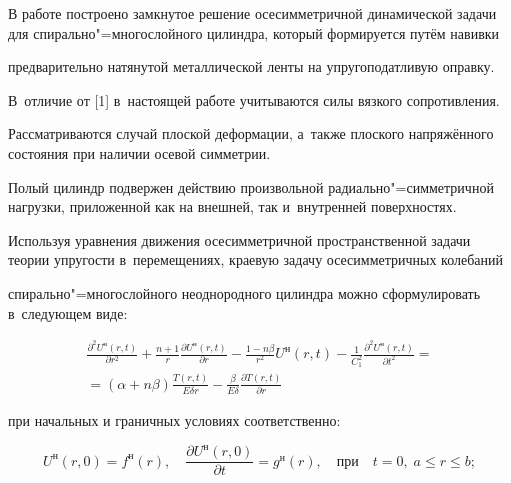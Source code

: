 \maketitle





В работе построено замкнутое решение осесимметричной динамической задачи для спирально"=многослойного цилиндра, который формируется путём навивки 

предварительно натянутой металлической ленты на упругоподатливую оправку. 

В~отличие от [1] в~настоящей работе учитываются силы вязкого сопротивления.



Рассматриваются случай плоской деформации, а~также плоского напряжённого состояния при наличии осевой симметрии. 



Полый цилиндр подвержен действию произвольной радиально"=симметричной нагрузки, приложенной как на внешней, так и~внутренней поверхностях.



Используя уравнения движения осесимметричной пространственной задачи теории упругости в~перемещениях, краевую задачу осесимметричных колебаний 

спирально"=многослойного неоднородного цилиндра можно сформулировать в~следующем виде: 

\begin{multline}

\label{epishkin:eq1}

\frac{\partial^2 U^{\text{н}}(r, t)}{\partial r^2}+\frac{n+1}{r}\frac{\partial U^{\text{н}}(r,t)}{\partial r}-\frac{1-n\beta }{r^2}U^{\text{н}}(r,t)-\frac{1}{C_1^2 

}\frac{\partial ^2U^{\text{н}}(r,t)}{\partial t^2}= \\ =(\alpha +n\beta 

)\frac{T(r,t)}{E\delta r}-\frac{\beta }{E\delta }\frac{\partial 

T(r,t)}{\partial r}

\end{multline} 

при начальных и граничных условиях соответственно:

\begin{equation}

\label{epishkin:eq2}

U^{\text{н}}(r, 0)=f^{\text{н}}(r), \quad  \frac{\partial U^{\text{н}}(r, 0)}{\partial t}=g^{\text{н}}(r), \quad \text{при} \quad t=0, \; a\le r\le b;

\end{equation}

